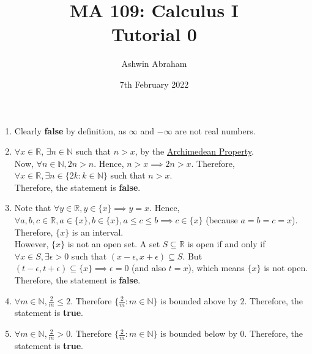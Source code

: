 \documentclass{article}
\title{MA 109: Calculus I\\Tutorial 0}				%
\author{Ashwin Abraham}%
\date{7th February 2022}		%
\begin{document}
\maketitle




\begin{enumerate} 
	\item Clearly \textbf{false} by definition, as $\infty$ and $-\infty$ are not real numbers.
	\item $\forall x \in \mathbb{R}$, $\exists n \in \mathbb{N}$ such that $n > x$, by the \href{https://en.wikipedia.org/wiki/Archimedean_property}{Archimedean Property}.
    \\Now, $\forall n \in \mathbb{N}, 2n > n$. Hence, $n > x \implies 2n > x$.
    Therefore, $\forall x \in \mathbb{R}, \exists n \in \{2k : k \in \mathbb{N}\}$ such that $n > x$. \\Therefore, the statement is \textbf{false}.
	\item Note that $\forall y \in \mathbb{R}, y \in \{x\} \implies y = x$.
	Hence, $\forall a, b,c \in \mathbb{R}, a \in \{x\}, b \in \{x\}, a \leq c \leq b \implies c \in \{x\}$ (because $a = b = c = x$).
	Therefore, $\{x\}$ is an interval.
	\\However, $\{x\}$ is not an open set. A set $S \subseteq \mathbb{R}$ is open if and only if $\forall x \in S, \exists \epsilon > 0$ such that $(x - \epsilon, x + \epsilon) \subseteq S$.
	But $(t - \epsilon, t + \epsilon) \subseteq \{x\} \implies \epsilon = 0$ (and also $t = x$), which means $\{x\}$ is not open.
	\\Therefore, the statement is \textbf{false}.
	\item $\forall m \in \mathbb{N}, \frac{2}{m} \leq 2$. Therefore $\{\frac{2}{m}: m \in \mathbb{N}\}$ is bounded above by $2$. Therefore, the statement is \textbf{true}.
	\item $\forall m \in \mathbb{N}, \frac{2}{m} > 0$. Therefore $\{\frac{2}{m}: m \in \mathbb{N}\}$ is bounded below by $0$. Therefore, the statement is \textbf{true}.

\end{enumerate}
\end{document}
